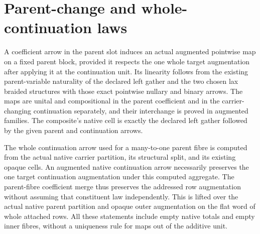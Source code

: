 \documentclass{article}
\begin{document}
\section*{Parent-change and whole-continuation laws}
A coefficient arrow in the parent slot induces an actual augmented
pointwise map on a fixed parent block, provided it respects the one
whole target augmentation after applying it at the continuation unit.
Its linearity follows from the existing parent-variable naturality of
the declared left gather and the two chosen lax braided structures
with those exact pointwise nullary and binary arrows. The maps are
unital and compositional in the parent coefficient and in the
carrier-changing continuation separately, and their interchange is
proved in augmented families. The composite's native cell is exactly
the declared left gather followed by the given parent and continuation
arrows.

The whole continuation arrow used for a many-to-one parent fibre
is computed from the actual native carrier partition, its structural
split, and its existing opaque cells. An augmented native continuation
arrow necessarily preserves the one target continuation augmentation
under this computed aggregate. The parent-fibre coefficient merge thus
preserves the addressed row augmentation without assuming that
constituent law independently. This is lifted over the actual native
parent partition and opaque outer augmentation on the flat word of
whole attached rows. All these statements include empty
native totals and empty inner fibres, without a uniqueness rule for
maps out of the additive unit.
\end{document}

